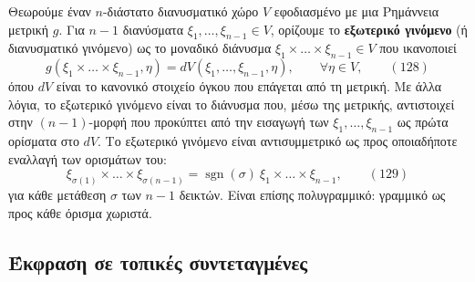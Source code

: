 \documentclass[12pt]{article}
\begin{document}
Θεωρούμε έναν $n$-διάστατο διανυσματικό χώρο $V$ εφοδιασμένο με μια Ρημάννεια μετρική $g$. Για $n-1$ διανύσματα $\xi_1, \dots, \xi_{n-1} \in V$, ορίζουμε το \textbf{εξωτερικό γινόμενο} (ή διανυσματικό γινόμενο) ως το μοναδικό διάνυσμα $\xi_1 \times \dots \times \xi_{n-1} \in V$ που ικανοποιεί
\begin{equation}
g(\xi_1 \times \dots \times \xi_{n-1}, \eta) = dV(\xi_1, \dots, \xi_{n-1}, \eta), \qquad \forall \eta \in V, \qquad (128)
\end{equation}
όπου $dV$ είναι το κανονικό στοιχείο όγκου που επάγεται από τη μετρική. Με άλλα λόγια, το εξωτερικό γινόμενο είναι το διάνυσμα που, μέσω της μετρικής, αντιστοιχεί στην $(n-1)$-μορφή που προκύπτει από την εισαγωγή των $\xi_1, \dots, \xi_{n-1}$ ως πρώτα ορίσματα στο $dV$. Το εξωτερικό γινόμενο είναι αντισυμμετρικό ως προς οποιαδήποτε εναλλαγή των ορισμάτων του:
\begin{equation}
\xi_{\sigma(1)} \times \dots \times \xi_{\sigma(n-1)} = \operatorname{sgn}(\sigma) \ \xi_1 \times \dots \times \xi_{n-1}, \qquad (129)
\end{equation}
για κάθε μετάθεση $\sigma$ των $n-1$ δεικτών. Είναι επίσης πολυγραμμικό: γραμμικό ως προς κάθε όρισμα χωριστά.

\subsection{Έκφραση σε τοπικές συντεταγμένες}
\end{document}
